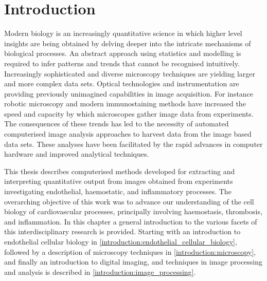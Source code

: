\chapter{Introduction}
\label{introduction}
\ifpdf
	\graphicspath{{chapter_1/figs/}}
\fi


Modern biology is an increasingly quantitative science in which higher level insights are being obtained by delving deeper into the intricate mechanisms of biological processes. An abstract approach using statistics and modelling is required to infer patterns and trends that cannot be recognised intuitively. Increasingly sophisticated and diverse microscopy techniques are yielding larger and more complex data sets. Optical technologies and instrumentation are providing previously unimagined capabilities in image acquisition. For instance robotic microscopy and modern immunostaining methods have increased the speed and capacity by which microscopes gather image data from experiments. The consequences of these trends has led to the necessity of automated computerised image analysis approaches to harvest data from the image based data sets. These analyses have been facilitated by the rapid advances in computer hardware and improved analytical techniques.

This thesis describes computerised methods developed for extracting and interpreting quantitative output from images obtained from experiments investigating endothelial, haemostatic, and inflammatory processes. The overarching objective of this work was to advance our understanding of the cell biology of cardiovascular processes, principally involving haemostasis, thrombosis, and inflammation. In this chapter a general introduction to the various facets of this interdisciplinary research is provided. Starting with an introduction to endothelial cellular biology in \autoref{introduction:endothelial_cellular_biology}, followed by a description of microscopy techniques in \autoref{introduction:microscopy}, and finally an introduction to digital imaging, and techniques in image processing and analysis is described in \autoref{introduction:image_processing}.


